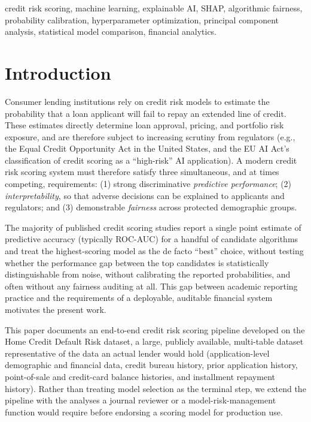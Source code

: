 \documentclass[journal]{IEEEtran}
\begin{document}
\begin{IEEEkeywords}
credit risk scoring, machine learning, explainable AI, SHAP, algorithmic fairness, probability calibration, hyperparameter optimization, principal component analysis, statistical model comparison, financial analytics.
\end{IEEEkeywords}

\section{Introduction}

Consumer lending institutions rely on credit risk models to estimate the probability that a loan applicant will fail to repay an extended line of credit. These estimates directly determine loan approval, pricing, and portfolio risk exposure, and are therefore subject to increasing scrutiny from regulators (e.g., the Equal Credit Opportunity Act in the United States, and the EU AI Act's classification of credit scoring as a ``high-risk'' AI application). A modern credit risk scoring system must therefore satisfy three simultaneous, and at times competing, requirements: (1) strong discriminative \emph{predictive performance}; (2) \emph{interpretability}, so that adverse decisions can be explained to applicants and regulators; and (3) demonstrable \emph{fairness} across protected demographic groups.

The majority of published credit scoring studies report a single point estimate of predictive accuracy (typically ROC-AUC) for a handful of candidate algorithms and treat the highest-scoring model as the de facto ``best'' choice, without testing whether the performance gap between the top candidates is statistically distinguishable from noise, without calibrating the reported probabilities, and often without any fairness auditing at all. This gap between academic reporting practice and the requirements of a deployable, auditable financial system motivates the present work.

This paper documents an end-to-end credit risk scoring pipeline developed on the Home Credit Default Risk dataset, a large, publicly available, multi-table dataset representative of the data an actual lender would hold (application-level demographic and financial data, credit bureau history, prior application history, point-of-sale and credit-card balance histories, and installment repayment history). Rather than treating model selection as the terminal step, we extend the pipeline with the analyses a journal reviewer or a model-risk-management function would require before endorsing a scoring model for production use.
\end{document}
